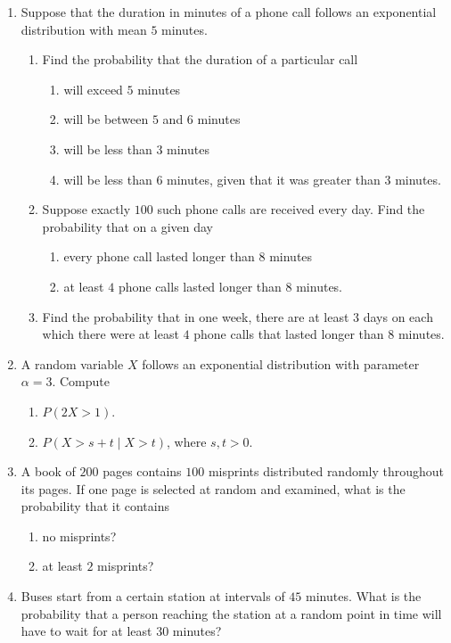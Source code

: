 \documentclass[svgnames]{amsart}
\begin{document}
\begin{enumerate}[leftmargin=*]
\item Suppose that the duration in minutes of a phone call follows an exponential distribution with mean $5$ minutes.
\begin{enumerate}
\item  Find the probability that the duration of a particular call
\begin{enumerate}
	\item will exceed $5$ minutes
	\item will be between $5$ and $6$ minutes
	\item will be less than $3$ minutes
	\item will be less than $6$ minutes, given that it was greater than $3$ minutes.
\end{enumerate}
\item Suppose exactly $100$ such phone calls are received every day. Find the probability that on a given day
\begin{enumerate}
	\item every phone call lasted longer than $8$ minutes
	\item at least $4$ phone calls lasted longer than $8$ minutes.
\end{enumerate}
\item Find the probability that in one week, there are at least $3$ days on each which there were at least $4$ phone calls that lasted longer than $8$ minutes.
\end{enumerate}

\item A random variable $X$ follows an exponential distribution with parameter $\alpha = 3$. Compute
\begin{enumerate}
	\item $P(2X > 1)$.
	\item $P(X > s + t \mid X > t)$, where $s, t > 0$.
\end{enumerate}

\item A book of $200$ pages contains $100$ misprints distributed randomly throughout its pages. If one page is selected at random and examined, what is the probability that it contains
\begin{enumerate}
	\item no misprints?
	\item at least $2$ misprints?
\end{enumerate}

\item Buses start from a certain station at intervals of $45$ minutes. What is the probability that a person reaching the station at a random point in time will have to wait for at least $30$ minutes?
\end{enumerate}
\end{document}
